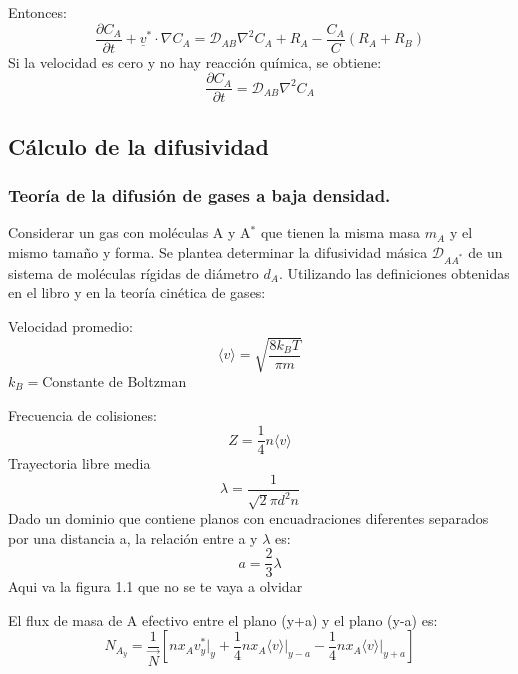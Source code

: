  Entonces:
 \begin{equation}
 	\frac{\partial C_A}{\partial t} + \underline{v}^* \cdot\nabla C_A=\mathscr{D}_{AB} \nabla^2 C_A+R_A-\frac{C_A}{C}(R_A+R_B) \tag{1.32}\label{eq_1.32}
 \end{equation}
 Si la velocidad es cero y no hay reacción química, se obtiene:
  \begin{equation}
 	\frac{\partial C_A}{\partial t}=\mathscr{D}_{AB} \nabla^2 C_A \tag{1.33}\label{eq_1.33}
 	\end{equation}
 	
 	\subsection{Cálculo de la difusividad}
 	\subsubsection{Teoría de la difusión de gases a baja densidad.}
 		Considerar un gas con moléculas A y A$^*$	que tienen la misma masa $m_A$
 		y el mismo tamaño y forma. Se plantea determinar la difusividad másica $\mathscr{D}_{AA^*}$
 		de un sistema de moléculas rígidas de diámetro $d_A$. Utilizando las definiciones obtenidas en el libro y en la teoría cinética de gases:
 	
 	Velocidad promedio:
 		\begin{equation}
 			\langle v \rangle = \sqrt{\frac{8k_B	T}{\pi m}}  \tag{1.34}\label{eq_1.34}
 		\end{equation}
 		$k_B=$Constante de Boltzman
 	
 	Frecuencia de colisiones:
 		\begin{equation}
 			Z = \frac{1}{4} n \langle v \rangle  \tag{1.35}\label{eq_1.35}
 		\end{equation}
 		Trayectoria libre media
 		\begin{equation}
 			\lambda = \frac{1}{\sqrt{2} \pi d^2 n}  \tag{1.36}\label{eq_1.36}
 		\end{equation}
 		Dado un dominio que contiene planos con encuadraciones diferentes separados por una distancia a, la relación entre a y $\lambda$ es:
 		 		\begin{equation}
 		 			a=\frac{2}{3} \lambda \tag{1.37}\label{eq_1.37}
 		 			\end{equation}
        Aqui va la figura 1.1 que no se te vaya a olvidar

        
        El flux de masa de A efectivo entre el plano (y+a) y el plano (y-a) es:
        \begin{equation}
N_{A_{y}} = \frac{1}{\vec{N}} \left[ n x_A  v_y^* \bigg|_{y} + \frac{1}{4}n x_A \langle v \rangle \bigg|_{y-a}- \frac{1}{4} nx_A\langle v \rangle \bigg|_{y+a} \right]
\tag{1.38} \label{eq_1.38}
\end{equation}

